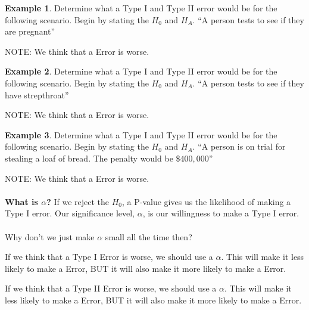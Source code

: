 \documentclass[12pt]{amsart}
\theoremstyle{definition}
\newtheorem{ex}{Example}
\begin{document}
 \begin{ex} Determine what a Type I and Type II error would be for the following scenario. Begin by stating the $H_0$ and $H_A$. ``A person tests to see if they are pregnant''\end{ex}
 
 \vspace{1in}
 
 NOTE: We think that a \underline{\hspace{1in}} Error is worse.\\
 
 
 \newpage
 \begin{ex} Determine what a Type I and Type II error would be for the following scenario. Begin by stating the $H_0$ and $H_A$. ``A person tests to see if they have strepthroat''\end{ex}
 
 \vspace{1in}
 
 NOTE: We think that a \underline{\hspace{1in}} Error is worse.\\
 
  \begin{ex} Determine what a Type I and Type II error would be for the following scenario. Begin by stating the $H_0$ and $H_A$. ``A person is on trial for stealing a loaf of bread. The penalty would be $\$400,000$''\end{ex}
 
 \vspace{1in}
 
 NOTE: We think that a \underline{\hspace{1in}} Error is worse.\\
 ~\\
 \textbf{What is $\alpha$?} If we reject the $H_0$, a P-value gives us the likelihood of making a Type I error. Our significance level, $\alpha$, is our willingness to make a Type I error.\\
 ~\\
 Why don't we just make $\alpha$ small all the time then?
 
 \vfill
 \begin{framed}
  If we think that a Type I Error is worse, we should use a \underline{\hspace{1in}} $\alpha$. This will make it less likely to make a \underline{\hspace{1in}} Error, BUT it will also make it more likely to make a \underline{\hspace{1in}} Error.
 \end{framed}
 \begin{framed}
  If we think that a Type II Error is worse, we should use a \underline{\hspace{1in}} $\alpha$. This will make it less likely to make a \underline{\hspace{1in}} Error, BUT it will also make it more likely to make a \underline{\hspace{1in}} Error.
 \end{framed}
 
\end{document}
